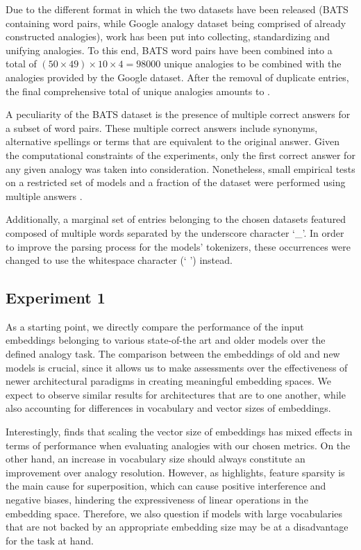 Due to the different format in which the two datasets have been released (BATS containing word pairs, while Google analogy dataset being comprised of already constructed analogies),  work has been put into collecting, standardizing and unifying analogies.
To this end, BATS word pairs have been combined into a total of $(50 \times 49) \times 10 \times 4 = 98000$ unique analogies to be combined with the  analogies provided by the Google dataset.
After the removal of duplicate entries, the final comprehensive total of unique analogies amounts to .

A peculiarity of the BATS dataset is the presence of multiple correct answers for a subset of word pairs.
These multiple correct answers include synonyms, alternative spellings or terms that are equivalent to the original answer.
Given the computational constraints of the experiments, only the first correct answer for any given analogy was taken into consideration.
Nonetheless, small empirical tests on a restricted set of models and a fraction of the dataset were performed using multiple answers .

Additionally, a marginal set of entries belonging to the chosen datasets featured  composed of multiple words separated by the underscore character `\_'.
In order to improve the parsing process for the models' tokenizers, these occurrences were changed to use the whitespace character (` ') instead.

\subsection{Experiment 1}\label{ssec:exp_emb_exp1}

As a starting point, we directly compare the performance of the input embeddings belonging to various state-of-the art and older models over the defined analogy task.
The comparison between the embeddings of old and new models is crucial, since it allows us to make assessments over the effectiveness of newer architectural paradigms in creating meaningful embedding spaces.
We expect to observe similar results for architectures that are  to one another, while also accounting for differences in vocabulary and vector sizes of embeddings.

Interestingly, \citet{drozd2016} finds that scaling the vector size of embeddings has mixed effects in terms of performance when evaluating analogies with our chosen metrics.
On the other hand, an increase in vocabulary size should always constitute an improvement over analogy resolution.
However, as \citet{elhage2022} highlights, feature sparsity is the main cause for superposition, which can cause positive interference and negative biases, hindering the expressiveness of linear operations in the embedding space.
Therefore, we also question if models with large vocabularies that are not backed by an appropriate embedding size may be at a disadvantage for the task at hand.

